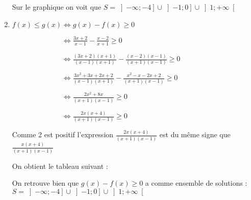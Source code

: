 \begin{corrige}
\begin{enumerate}
          \par
          Sur le graphique on voit que $S=\left]-\infty ;-4\right] \cup  \left]-1;0\right] \cup  \left]1;+\infty \right[$
          \item
          $f\left(x\right)\leqslant g\left(x\right)  \Leftrightarrow  g\left(x\right)-f\left(x\right) \geqslant 0$
          \par
          $\phantom{f\left(x\right)\leqslant g\left(x\right)} \Leftrightarrow  \frac{3x+2}{x-1}-\frac{x-2}{x+1} \geqslant  0  $
          \par
          $\phantom{f\left(x\right)\leqslant g\left(x\right)} \Leftrightarrow  \frac{\left(3x+2\right)\left(x+1\right)}{\left(x-1\right)\left(x+1\right)}-\frac{\left(x-2\right)\left(x-1\right)}{\left(x+1\right)\left(x-1\right)} \geqslant  0  $
          \par
          $\phantom{f\left(x\right)\leqslant g\left(x\right)} \Leftrightarrow  \frac{3x^{2}+3x+2x+2}{\left(x-1\right)\left(x+1\right)}-\frac{x^{2}-x-2x+2}{\left(x+1\right)\left(x-1\right)} \geqslant  0  $
          \par
          $\phantom{f\left(x\right)\leqslant g\left(x\right)} \Leftrightarrow  \frac{2x^{2}+8x}{\left(x+1\right)\left(x-1\right)} \geqslant  0  $
          \par
          $\phantom{f\left(x\right)\leqslant g\left(x\right)} \Leftrightarrow  \frac{2x\left(x+4\right)}{\left(x+1\right)\left(x-1\right)} \geqslant  0  $
          \par
          Comme 2 est positif l'expression $\frac{2x\left(x+4\right)}{\left(x+1\right)\left(x-1\right)}$ est du même signe que $\frac{x\left(x+4\right)}{\left(x+1\right)\left(x-1\right)}$
          \par
          On obtient le tableau suivant :
\\

\begin{center}
\end{center}

          On retrouve bien que $g\left(x\right)-f\left(x\right)\geqslant 0$ a comme ensemble de solutions :  $S=\left]-\infty ;-4\right] \cup  \left]-1;0\right] \cup  \left]1;+\infty \right[$
     \end{enumerate}
\end{corrige}
